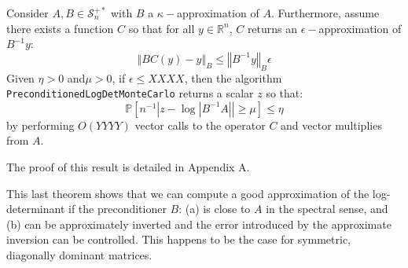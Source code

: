 \begin{theorem}\label{thm:preconditioning-approx}Consider $A,B\in\mathcal{S}_{n}^{+*}$
with $B$ a $\kappa-$approximation of $A$. Furthermore, assume there
exists a function $C$ so that for all $y\in\mathbb{R}^{n}$, $C$
returns an $\epsilon-$approximation of $B^{-1}y$:
\[
\left\Vert BC\left(y\right)-y\right\Vert _{B}\leq\left\Vert B^{-1}y\right\Vert _{B}\epsilon
\]
Given $\eta>0$ and$\mu>0$, if $\epsilon\leq XXXX$, then the algorithm
\texttt{PreconditionedLogDetMonteCarlo} returns a scalar $z$ so that:
\[
\mathbb{P}\left[n^{-1}\left|z-\log\left|B^{-1}A\right|\right|\geq\mu\right]\leq\eta
\]
by performing $O\left(YYYY\right)$ vector calls to the operator $C$
and vector multiplies from $A$. 

\end{theorem}

The proof of this result is detailed in Appendix A.

This last theorem shows that we can compute a good approximation of
the log-determinant if the preconditioner $B$: (a) is close to $A$
in the spectral sense, and (b) can be approximately inverted and the
error introduced by the approximate inversion can be controlled. This
happens to be the case for symmetric, diagonally dominant matrices.
